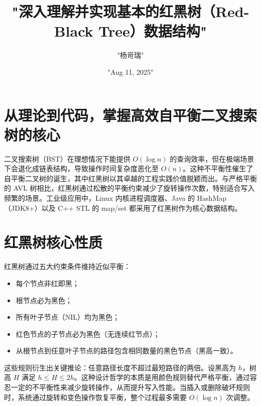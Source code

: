 \title{"深入理解并实现基本的红黑树（Red-Black Tree）数据结构"}
\author{"杨岢瑞"}
\date{"Aug 11, 2025"}
\maketitle
\chapter{从理论到代码，掌握高效自平衡二叉搜索树的核心}
二叉搜索树（BST）在理想情况下能提供 $O(\log{n})$ 的查询效率，但在极端场景下会退化成链表结构，导致操作时间复杂度恶化至 $O(n)$。这种不平衡性催生了自平衡二叉树的诞生，其中红黑树以其卓越的工程实践价值脱颖而出。与严格平衡的 AVL 树相比，红黑树通过松散的平衡约束减少了旋转操作次数，特别适合写入频繁的场景。工业级应用中，Linux 内核进程调度器、Java 的 HashMap（JDK8+）以及 C++ STL 的 map/set 都采用了红黑树作为核心数据结构。\par
\chapter{红黑树核心性质}
红黑树通过五大约束条件维持近似平衡：\par
\begin{itemize}
\item 每个节点非红即黑；
\item 根节点必为黑色；
\item 所有叶子节点（NIL）均为黑色；
\item 红色节点的子节点必为黑色（无连续红节点）；
\item 从根节点到任意叶子节点的路径包含相同数量的黑色节点（黑高一致）。
\end{itemize}
这些规则衍生出关键推论：任意路径长度不超过最短路径的两倍。设黑高为 $h$，树高 $H$ 满足 $h {\leq} H {\leq} 2h$。这种设计哲学的本质是用颜色规则替代严格平衡，通过容忍一定的不平衡性来减少旋转操作，从而提升写入性能。当插入或删除破坏规则时，系统通过旋转和变色操作恢复平衡，整个过程最多需要 $O(\log{n})$ 次调整。\par
